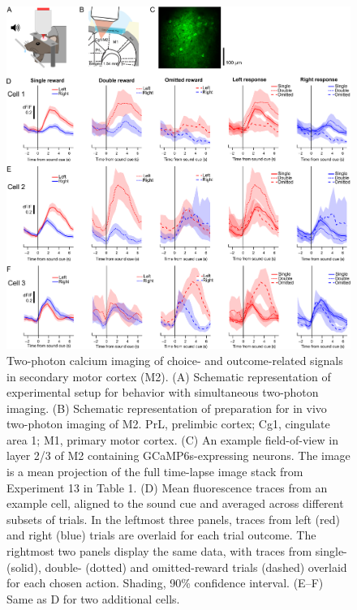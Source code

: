 \begin{figure}[htbp]

\begin{center}
\includegraphics[width=\textwidth]{Figures/Chapter2/CC_fig3} 
\end{center}

\caption[Two-photon Ca\textsuperscript{2+} imaging of choice- and outcome-related signals]
{Two-photon calcium imaging of choice- and outcome-related signals in secondary motor cortex (M2). (A) Schematic representation of experimental setup for behavior with simultaneous two-photon imaging. (B) Schematic representation of preparation for in vivo two-photon imaging of M2. PrL, prelimbic cortex; Cg1, cingulate area 1; M1, primary motor cortex. (C) An example field-of-view in layer 2/3 of M2 containing GCaMP6s-expressing neurons. The image is a mean projection of the full time-lapse image stack from Experiment 13 in Table 1. (D) Mean fluorescence traces from an example cell, aligned to the sound cue and averaged across different subsets of trials. In the leftmost three panels, traces from left (red) and right (blue) trials are overlaid for each trial outcome. The rightmost two panels display the same data, with traces from single- (solid), double- (dotted) and omitted-reward trials (dashed) overlaid for each chosen action. Shading, 90\% confidence interval. (E–F) Same as D for two additional cells.}

\label{fig:CC_fig3}
\end{figure}